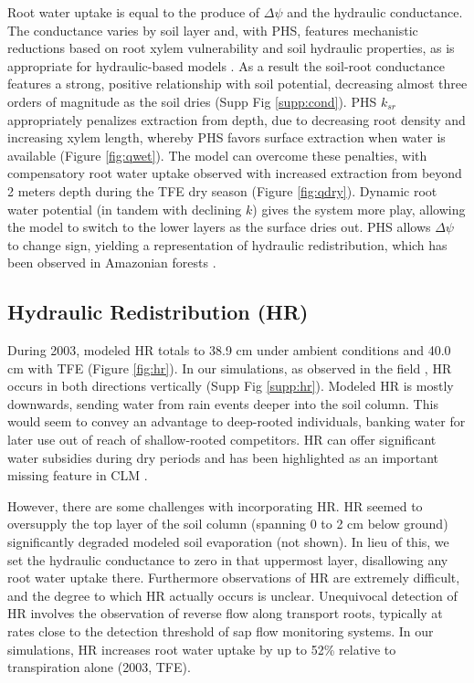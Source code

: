 \documentclass[draft,linenumbers]{agujournal}
\begin{document}
    Root water uptake is equal to the produce of $\Delta\psi$ and the hydraulic conductance. 
    The conductance varies by soil layer and, with PHS, features mechanistic reductions based on root xylem vulnerability and soil hydraulic properties, 
    as is appropriate for hydraulic-based models \citep{cai2014,warren2014}.
    As a result the soil-root conductance features a strong, positive relationship with soil potential, decreasing almost three orders of magnitude as the soil dries (Supp Fig \ref{supp:cond}).
    PHS $k_{sr}$ appropriately penalizes extraction from depth, due to decreasing root density and increasing xylem length, 
    whereby PHS favors surface extraction when water is available (Figure \ref{fig:qwet}).
    The model can overcome these penalties, with compensatory root water uptake observed with increased extraction from beyond 2 meters depth during the TFE dry season (Figure \ref{fig:qdry}).
    Dynamic root water potential (in tandem with declining $k$) gives the system more play, allowing the model to switch to the lower layers as the surface dries out.
    PHS allows $\Delta\psi$ to change sign, yielding a representation of hydraulic redistribution, which has been observed in Amazonian forests \citep{oliveira2005}.
    
\subsection{Hydraulic Redistribution (HR)}
    During 2003, modeled HR totals to 38.9 cm under ambient conditions and 40.0 cm with TFE (Figure \ref{fig:hr}).
    In our simulations, as observed in the field \citep{burgess1998}, HR occurs in both directions vertically (Supp Fig \ref{supp:hr}).
    Modeled HR is mostly downwards, sending water from rain events deeper into the soil column.
    This would seem to convey an advantage to deep-rooted individuals, banking water for later use out of reach of shallow-rooted competitors.
    HR can offer significant water subsidies during dry periods \citep{jackson2000} and has been highlighted as an important missing feature in CLM \citep{lee2005}.
    
    However, there are some challenges with incorporating HR.
    HR seemed to oversupply the top layer of the soil column (spanning 0 to 2 cm below ground) significantly degraded modeled soil evaporation (not shown). 
    In lieu of this, we set the hydraulic conductance to zero in that uppermost layer, disallowing any root water uptake there.
    Furthermore observations of HR are extremely difficult, and the degree to which HR actually occurs is unclear. 
    Unequivocal detection of HR involves the observation of reverse flow along transport roots, typically at rates close to the detection threshold of sap flow monitoring systems. 
    In our simulations, HR increases root water uptake by up to 52\% relative to transpiration alone (2003, TFE).
    
\end{document}
